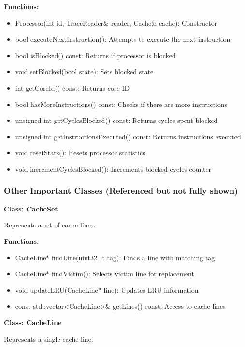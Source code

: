 \documentclass[12pt,a4paper]{article}
\begin{document}
\textbf{Functions:}
\begin{itemize}
    \item Processor(int id, TraceReader\& reader, Cache\& cache): Constructor
    \item bool executeNextInstruction(): Attempts to execute the next instruction
    \item bool isBlocked() const: Returns if processor is blocked
    \item void setBlocked(bool state): Sets blocked state
    \item int getCoreId() const: Returns core ID
    \item bool hasMoreInstructions() const: Checks if there are more instructions
    \item unsigned int getCyclesBlocked() const: Returns cycles spent blocked
    \item unsigned int getInstructionsExecuted() const: Returns instructions executed
    \item void resetStats(): Resets processor statistics
    \item void incrementCyclesBlocked(): Increments blocked cycles counter
\end{itemize}

\subsubsection*{Other Important Classes (Referenced but not fully shown)}

\textbf{Class: CacheSet}

Represents a set of cache lines.

\textbf{Functions:}
\begin{itemize}
    \item CacheLine* findLine(uint32\_t tag): Finds a line with matching tag
    \item CacheLine* findVictim(): Selects victim line for replacement
    \item void updateLRU(CacheLine* line): Updates LRU information
    \item const std::vector<CacheLine>\& getLines() const: Access to cache lines
\end{itemize}

\textbf{Class: CacheLine}

Represents a single cache line.
\end{document}
